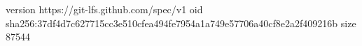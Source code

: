 version https://git-lfs.github.com/spec/v1
oid sha256:37df4d7c627715cc3e510cfea494fe7954a1a749e57706a40cf8e2a2f409216b
size 87544
